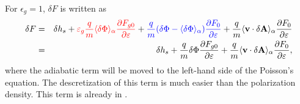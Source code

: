 \documentclass{llncs}
\newcommand{\tmcolor}[2]{{\color{#1}{#2}}}
\newcommand{\tmtexttt}[1]{\text{{\ttfamily{#1}}}}
\begin{document}
For $\epsilon_g = 1$, $\delta F$ is written as
\begin{eqnarray}
  \delta F & = & \delta h_s + \tmcolor{red}{\varepsilon_g \frac{q}{m} \langle
  \delta \Phi \rangle_{\alpha} \frac{\partial F_{g 0}}{\partial \varepsilon}}
  + \tmcolor{blue}{\frac{q}{m} (\delta \Phi - \langle \delta \Phi
  \rangle_{\alpha}) \frac{\partial F_0}{\partial \varepsilon}} + \frac{q}{m}
  \langle \mathbf{v} \cdot \delta \mathbf{A} \rangle_{\alpha} \frac{\partial
  F_0}{\partial \varepsilon} \nonumber\\
  & = & \delta h_s + \frac{q}{m} \delta \Phi \frac{\partial F_{g 0}}{\partial
  \varepsilon} + \frac{q}{m} \langle \mathbf{v} \cdot \delta \mathbf{A}
  \rangle_{\alpha} \frac{\partial F_0}{\partial \varepsilon}, 
\end{eqnarray}
where the adiabatic term will be moved to the left-hand side of the Poisson's
equation. The descretization of this term is much easier than the polarization
density. This term is already in \tmtexttt{GEM}.
\end{document}
